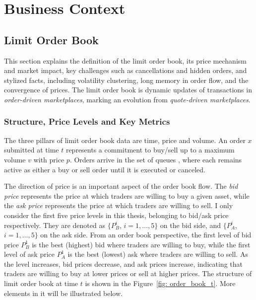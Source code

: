 \chapter{Business Context}\label{chapter:business}

\section{Limit Order Book}
This section explains the definition of the limit order book, its price mechanism and market impact, key challenges such as cancellations and hidden orders, and stylized facts, including volatility clustering, long memory in order flow, and the convergence of prices. The limit order book is dynamic updates of transactions in \textit{order-driven marketplaces}, marking an evolution from \textit{quote-driven marketplaces}.

\subsection{Structure, Price Levels and Key Metrics}
The three pillars of limit order book data are time, price and volume. An order $x$ submitted at time $t$ represents a commitment to buy/sell up to a maximum volume $v$ with price $p$. Orders arrive in the set of queues \citep{gould_limit_2013}, where each remains active as either a buy or sell order until it is executed or canceled. 

The direction of price is an important aspect of the order book flow. The \textit{bid price} represents the price at which traders are willing to buy a given asset, while the \textit{ask price} represents the price at which traders are willing to sell. I only consider the first five price levels in this thesis, belonging to bid/ask price respectively. They are denoted as $\{P_B ^ {i}$, $i = 1, \dots, 5\}$ on the bid side, and $\{P_A ^ {i}$, $i = 1, \dots, 5\}$ on the ask side. From an order book perspective, the first level of bid price $P_B^1$ is the best (highest) bid where traders are willing to buy, while the first level of ask price $P_A^1$ is the best (lowest) ask where traders are willing to sell. As the level increases, bid prices decrease, and ask prices increase, indicating that traders are willing to buy at lower prices or sell at higher prices. The structure of limit order book at time $t$ is shown in the Figure~\ref{fig: order_book_t}. More elements in it will be illustrated below.

